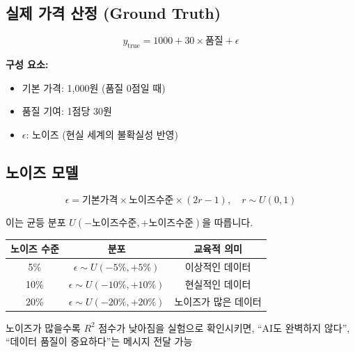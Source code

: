 \documentclass[11pt,a4paper]{article}
\begin{document}
\subsection{실제 가격 산정 (Ground Truth)}

\begin{tcolorbox}[colback=lightcyan,colframe=teal,title=\textbf{\texttwemoji{sparkles} 데이터 생성 공식}]
\begin{equation}
y_{\text{true}} = 1000 + 30 \times \text{품질} + \epsilon
\end{equation}

\textbf{구성 요소:}
\begin{itemize}
    \item 기본 가격: 1,000원 (품질 0점일 때)
    \item 품질 기여: 1점당 30원
    \item $\epsilon$: 노이즈 (현실 세계의 불확실성 반영)
\end{itemize}
\end{tcolorbox}

\subsection{노이즈 모델}

\begin{equation}
\epsilon = \text{기본가격} \times \text{노이즈수준} \times (2r - 1), \quad r \sim U(0, 1)
\end{equation}

이는 균등 분포 $U(-\text{노이즈수준}, +\text{노이즈수준})$을 따릅니다.

\begin{center}
\begin{tabular}{|c|c|c|}
\hline
\textbf{노이즈 수준} & \textbf{분포} & \textbf{교육적 의미} \\
\hline
5\% & $\epsilon \sim U(-5\%, +5\%)$ & 이상적인 데이터 \\
10\% & $\epsilon \sim U(-10\%, +10\%)$ & 현실적인 데이터 \\
20\% & $\epsilon \sim U(-20\%, +20\%)$ & 노이즈가 많은 데이터 \\
\hline
\end{tabular}
\end{center}

\begin{tcolorbox}[colback=lightyellow,colframe=orange,title=\textbf{\texttwemoji{teacher} 수업 활용 포인트}]
노이즈가 많을수록 $R^2$ 점수가 낮아짐을 실험으로 확인시키면, 
``AI도 완벽하지 않다'', ``데이터 품질이 중요하다''는 메시지 전달 가능
\end{tcolorbox}
\end{document}
